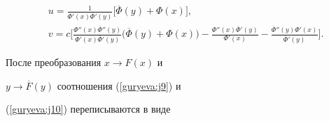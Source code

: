 \begin{equation} \label{guryeva:j10}


\begin{aligned}


&u= \frac{1}{\Phi'(x)\overline{\Phi}'(y)}\bigl[\overline{\Phi}(y)+\Phi(x)\bigr],


\\


&v=c\bigg[ \frac{\Phi''(x) \overline{\Phi}''(y)}{\Phi'(x)\overline{\Phi}'(y)}


\bigl( \overline{\Phi}(y)+\Phi(x)\bigr)-


\frac{\Phi''(x) \overline{\Phi}' (y)}{\Phi'(x)}-


 \frac{\overline{\Phi}''(y) \Phi' (x)}{\overline{\Phi}'(y)}\bigg].


\end{aligned}


\end{equation}








 После  преобразования $x\rightarrow F(x)$ и


$y\rightarrow\overline{F}(y)$ соотношения (\ref{guryeva:j9}) и


(\ref{guryeva:j10}) переписываются в виде


